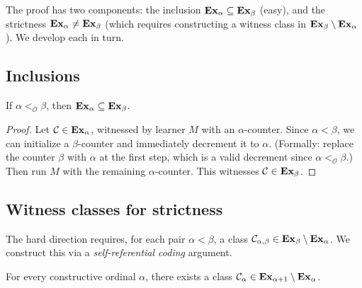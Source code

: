 The proof has two components: the inclusion $\mathbf{Ex}_\alpha \subseteq
\mathbf{Ex}_\beta$ (easy), and the strictness $\mathbf{Ex}_\alpha \neq \mathbf{Ex}_\beta$
(which requires constructing a witness class in $\mathbf{Ex}_\beta \setminus
\mathbf{Ex}_\alpha$).  We develop each in turn.

\subsection{Inclusions}

\begin{lemma}
\label{lem:inclusion}
If $\alpha <_{\mathcal{O}} \beta$, then $\mathbf{Ex}_\alpha \subseteq \mathbf{Ex}_\beta$.
\end{lemma}

\begin{proof}
Let $\mathcal{C} \in \mathbf{Ex}_\alpha$, witnessed by learner $M$ with an
$\alpha$-counter.  Since $\alpha < \beta$, we can initialize a
$\beta$-counter and immediately decrement it to $\alpha$.  (Formally:
replace the counter $\beta$ with $\alpha$ at the first step, which is
a valid decrement since $\alpha <_{\mathcal{O}} \beta$.)  Then run $M$
with the remaining $\alpha$-counter.  This witnesses
$\mathcal{C} \in \mathbf{Ex}_\beta$.
\end{proof}

\subsection{Witness classes for strictness}

The hard direction requires, for each pair $\alpha < \beta$, a class
$\mathcal{C}_{\alpha,\beta} \in \mathbf{Ex}_\beta \setminus \mathbf{Ex}_\alpha$.  We
construct this via a \emph{self-referential coding} argument.

\begin{lemma}
\label{lem:witness}
For every constructive ordinal $\alpha$, there exists a class
$\mathcal{C}_\alpha \in \mathbf{Ex}_{\alpha+1} \setminus \mathbf{Ex}_\alpha$.
\end{lemma}

